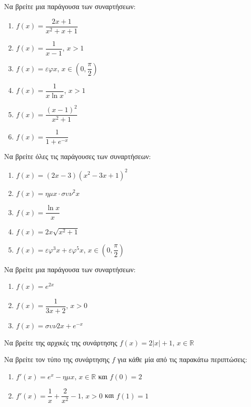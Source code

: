 \documentclass{presentation}
\begin{document}
\begin{askisi}
  Να βρείτε μια παράγουσα των συναρτήσεων:
  \begin{enumerate}[<+->]
    \item $f(x)=\dfrac{2x+1}{x^2+x+1}$
    \item $f(x)=\dfrac{1}{x-1}$, $x>1$
    \item $f(x)=εφx$, $x\in \left( 0,\dfrac{π}{2} \right) $
    \item $f(x)=\dfrac{1}{x\ln x}$, $x>1$
    \item $f(x)=\dfrac{(x-1)^2}{x^2+1}$
    \item $f(x)=\dfrac{1}{1+e^{-x}}$
  \end{enumerate}
\end{askisi}

\begin{askisi}
  Να βρείτε όλες τις παράγουσες των συναρτήσεων:
  \begin{enumerate}[<+->]
    \item $f(x)=(2x-3)(x^2-3x+1)^2$
    \item $f(x)=ημx\cdot συν^2x$
    \item $f(x)=\dfrac{\ln x}{x}$
    \item $f(x)=2x\sqrt{x^2+1}$
    \item $f(x)=εφ^3x+εφ^5x$, $x\in \left( 0,\dfrac{π}{2} \right)$
  \end{enumerate}
\end{askisi}

\begin{askisi}
  Να βρείτε μια παράγουσα των συναρτήσεων:
  \begin{enumerate}[<+->]
    \item $f(x)=e^{2x}$
    \item $f(x)=\dfrac{1}{3x+2}$, $x>0$
    \item $f(x)=συν2x+e^{-x}$
  \end{enumerate}
\end{askisi}

\begin{askisi}
  Να βρείτε της αρχικές της συνάρτησης $f(x)=2|x|+1$, $x\in\mathbb{R}$
\end{askisi}

\begin{askisi}
  Να βρείτε τον τύπο της συνάρτησης $f$ για κάθε μία από τις παρακάτω περιπτώσεις:
  \begin{enumerate}[<+->]
    \item $f'(x)=e^x-ημx$, $x\in\mathbb{R}$ και $f(0)=2$
    \item $f'(x)=\dfrac{1}{x}+\dfrac{2}{x^2}-1$, $x>0$ και $f(1)=1$
  \end{enumerate}
\end{askisi}
\end{document}
